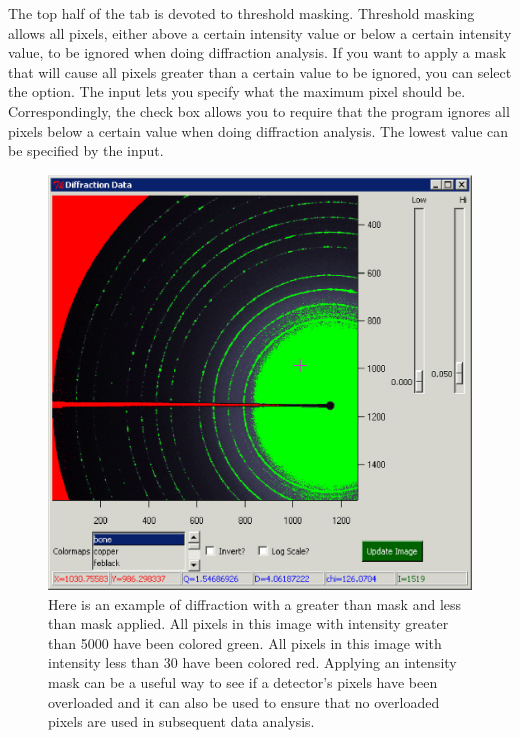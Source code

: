 The top half of the  tab is devoted to 
threshold masking. Threshold masking allows all pixels, 
either above a certain intensity value or below a certain 
intensity value, to be ignored when doing diffraction 
analysis. If you want to apply a mask that will cause 
all pixels greater than a certain value to be ignored,
you can select the  option.
The  input 
lets you specify what the maximum pixel should be.
Correspondingly, the  check box
allows you to require that the program ignores all
pixels below a certain value when doing diffraction
analysis. The lowest value can be specified by the 
 input. 

\begin{figure}
\centering
\includegraphics[scale=.75]{figures/Threshold_Masking.eps}
\caption{Here is an example of diffraction with a
greater than mask and less than mask applied.
All pixels in this image with intensity greater than 5000 
have been colored green. All pixels in this image with 
intensity less than 30 have been colored red. Applying
an intensity mask can be a useful way to see if a detector's
pixels have been overloaded and it can also be used to
ensure that no overloaded pixels are used in subsequent
data analysis.}
\label{Threshold_Masking}
\end{figure}


